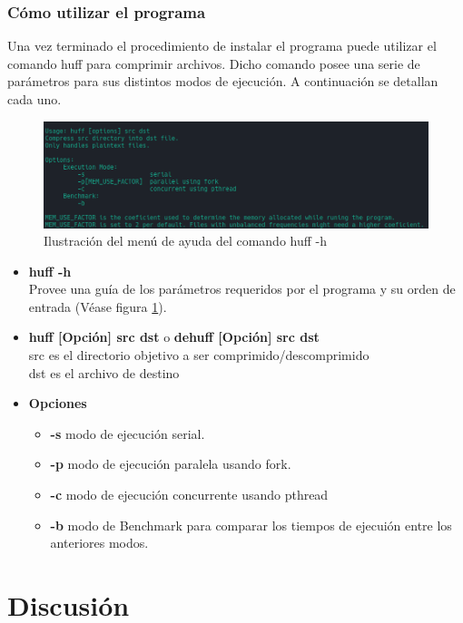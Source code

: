 \documentclass{report}
\begin{document}
\subsubsection{Cómo utilizar el programa}
Una vez terminado el procedimiento de instalar el programa puede utilizar el comando huff para comprimir archivos. Dicho comando posee una serie de parámetros para sus distintos modos de ejecución. A continuación se detallan cada uno.

\begin{figure}[h]
    \centering
    \includegraphics[width=0.8\linewidth]{figuras/huff_ayuda.png}
    \caption{Ilustración del menú de ayuda del comando huff -h}
    \label{fig:huffayuda}
\end{figure}

\begin{itemize}
  \item \textbf{huff -h}\\ \hspace{2cm}
    Provee una guía de los parámetros requeridos por el programa y su orden de entrada (Véase figura \ref{fig:huffayuda}).
  \item \textbf{huff [Opción] src dst} o \textbf{dehuff [Opción] src dst}\\
src es el directorio objetivo a ser comprimido/descomprimido\\
dst es el archivo de destino
  \item \textbf{Opciones} 
    \begin{itemize}
      \item \textbf{-s} modo de ejecución serial.
      \item \textbf{-p} modo de ejecución paralela usando fork.
      \item \textbf{-c} modo de ejecución concurrente usando pthread
      \item \textbf{-b} modo de Benchmark para comparar los tiempos de ejecuión entre los anteriores modos.
    \end{itemize}
\end{itemize}





\section{Discusión}
\end{document}
